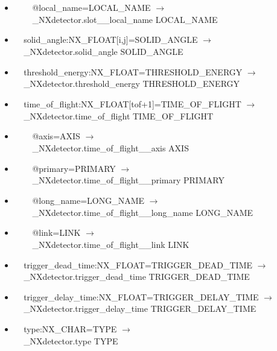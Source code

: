\documentclass[11pt]{article}
\begin{document}
{{\begin{itemize}
\item{\verb|    |@local\_name=LOCAL\_NAME $\rightarrow$\\
\verb|    |\_NXdetector.slot\_\_local\_name LOCAL\_NAME}

\item{\verb|  |solid\_angle:NX\_FLOAT[i,j]=SOLID\_ANGLE $\rightarrow$\\
\verb|  |\_NXdetector.solid\_angle SOLID\_ANGLE}

\item{\verb|  |threshold\_energy:NX\_FLOAT=THRESHOLD\_ENERGY $\rightarrow$\\
\verb|  |\_NXdetector.threshold\_energy THRESHOLD\_ENERGY}

\item{\verb|  |time\_of\_flight:NX\_FLOAT[tof+1]=TIME\_OF\_FLIGHT $\rightarrow$\\
\verb|  |\_NXdetector.time\_of\_flight TIME\_OF\_FLIGHT}

\item{\verb|    |@axis=AXIS $\rightarrow$\\
\verb|    |\_NXdetector.time\_of\_flight\_\_axis AXIS}

\item{\verb|    |@primary=PRIMARY $\rightarrow$\\
\verb|    |\_NXdetector.time\_of\_flight\_\_primary PRIMARY}

\item{\verb|    |@long\_name=LONG\_NAME $\rightarrow$\\
\verb|    |\_NXdetector.time\_of\_flight\_\_long\_name LONG\_NAME}

\item{\verb|    |@link=LINK $\rightarrow$\\
\verb|    |\_NXdetector.time\_of\_flight\_\_link LINK}

\item{\verb|  |trigger\_dead\_time:NX\_FLOAT=TRIGGER\_DEAD\_TIME $\rightarrow$\\
\verb|  |\_NXdetector.trigger\_dead\_time TRIGGER\_DEAD\_TIME}

\item{\verb|  |trigger\_delay\_time:NX\_FLOAT=TRIGGER\_DELAY\_TIME $\rightarrow$\\
\verb|  |\_NXdetector.trigger\_delay\_time TRIGGER\_DELAY\_TIME}

\item{\verb|  |type:NX\_CHAR=TYPE $\rightarrow$\\
\verb|  |\_NXdetector.type TYPE}


\end{itemize}}}
\end{document}
